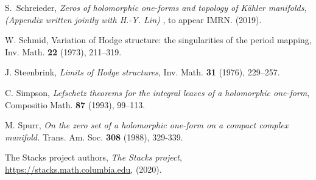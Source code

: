 \documentclass[a4paper,12pt,reqno]{amsart}
\theoremstyle{plain}
\theoremstyle{remark}
\begin{document}
\begin{thebibliography}{HKLR}
 S.\ Schreieder, \textit{Zeros of holomorphic one-forms and topology of K\"ahler manifolds, (Appendix written jointly with H.-Y. Lin) }, to appear IMRN. (2019).

 W. Schmid, Variation of Hodge structure: the singularities of the period mapping, Inv. Math. \textbf{22} (1973), 211--319.

 J. Steenbrink, \textit{Limits of Hodge structures}, Inv. Math. \textbf{31} (1976), 229--257.




 C. Simpson, \textit{Lefschetz theorems for the integral leaves of a holomorphic one-form}, Compositio Math. \textbf{87} (1993), 99--113.

 M. Spurr, {\it On the zero set of a holomorphic one-form on a compact complex manifold.} Trans. Am.
Soc. \textbf{308} (1988), 329-339. 

 The {Stacks project authors}, \textit{The Stacks project}, \url{https://stacks.math.columbia.edu}, (2020).


\end{thebibliography}
\end{document}
